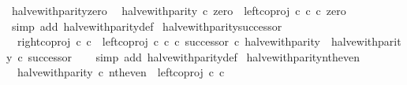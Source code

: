 \begin{isabellebody}
\isanewline
{}\isamarkupfalse%
\ halve{\isacharunderscore}{\kern0pt}with{\isacharunderscore}{\kern0pt}parity{\isacharunderscore}{\kern0pt}zero{\isacharcolon}{\kern0pt}\isanewline
\ \ {\isachardoublequoteopen}halve{\isacharunderscore}{\kern0pt}with{\isacharunderscore}{\kern0pt}parity\ {\isasymcirc}\isactrlsub c\ zero\ {\isacharequal}{\kern0pt}\ left{\isacharunderscore}{\kern0pt}coproj\ {\isasymnat}\isactrlsub c\ {\isasymnat}\isactrlsub c\ {\isasymcirc}\isactrlsub c\ zero{\isachardoublequoteclose}\isanewline
%
\isadelimproof
\ \ %
\endisadelimproof
%
\isatagproof
{}\isamarkupfalse%
\ {\isacharparenleft}{\kern0pt}simp\ add{\isacharcolon}{\kern0pt}\ halve{\isacharunderscore}{\kern0pt}with{\isacharunderscore}{\kern0pt}parity{\isacharunderscore}{\kern0pt}def{}{\isacharparenright}{\kern0pt}%
\endisatagproof
{\isafoldproof}%
%
\isadelimproof
\isanewline
%
\endisadelimproof
\isanewline
{}\isamarkupfalse%
\ halve{\isacharunderscore}{\kern0pt}with{\isacharunderscore}{\kern0pt}parity{\isacharunderscore}{\kern0pt}successor{\isacharcolon}{\kern0pt}\isanewline
\ \ {\isachardoublequoteopen}{\isacharparenleft}{\kern0pt}right{\isacharunderscore}{\kern0pt}coproj\ {\isasymnat}\isactrlsub c\ {\isasymnat}\isactrlsub c\ {\isasymamalg}\ {\isacharparenleft}{\kern0pt}left{\isacharunderscore}{\kern0pt}coproj\ {\isasymnat}\isactrlsub c\ {\isasymnat}\isactrlsub c\ {\isasymcirc}\isactrlsub c\ successor{\isacharparenright}{\kern0pt}{\isacharparenright}{\kern0pt}\ {\isasymcirc}\isactrlsub c\ halve{\isacharunderscore}{\kern0pt}with{\isacharunderscore}{\kern0pt}parity\ {\isacharequal}{\kern0pt}\ halve{\isacharunderscore}{\kern0pt}with{\isacharunderscore}{\kern0pt}parity\ {\isasymcirc}\isactrlsub c\ successor{\isachardoublequoteclose}\isanewline
%
\isadelimproof
\ \ %
\endisadelimproof
%
\isatagproof
{}\isamarkupfalse%
\ {\isacharparenleft}{\kern0pt}simp\ add{\isacharcolon}{\kern0pt}\ halve{\isacharunderscore}{\kern0pt}with{\isacharunderscore}{\kern0pt}parity{\isacharunderscore}{\kern0pt}def{}{\isacharparenright}{\kern0pt}%
\endisatagproof
{\isafoldproof}%
%
\isadelimproof
\isanewline
%
\endisadelimproof
\isanewline
{}\isamarkupfalse%
\ halve{\isacharunderscore}{\kern0pt}with{\isacharunderscore}{\kern0pt}parity{\isacharunderscore}{\kern0pt}nth{\isacharunderscore}{\kern0pt}even{\isacharcolon}{\kern0pt}\isanewline
\ \ {\isachardoublequoteopen}halve{\isacharunderscore}{\kern0pt}with{\isacharunderscore}{\kern0pt}parity\ {\isasymcirc}\isactrlsub c\ nth{\isacharunderscore}{\kern0pt}even\ {\isacharequal}{\kern0pt}\ left{\isacharunderscore}{\kern0pt}coproj\ {\isasymnat}\isactrlsub c\ {\isasymnat}\isactrlsub c{\isachardoublequoteclose}\isanewline

\end{isabellebody}
